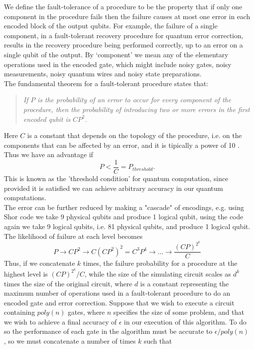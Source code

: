 We define the fault-tolerance of a procedure to be the property that if only one component in the procedure fails then the failure causes at most one error in each encoded block of the output qubits. For example, the failure of a single component, in a fault-tolerant recovery procedure for quantum error correction, results in the recovery procedure being performed correctly, up to an error on a single qubit of the output. By ‘component’ we mean any of the elementary operations used in the encoded gate, which might include noisy gates, noisy measurements, noisy quantum wires and noisy state preparations. \\
The fundamental theorem for a fault-tolerant procedure states that:
\begin{quote}
    \textit{If $P$ is the probability of an error to occur for every component of the procedure, then the probability of introducing two or more errors in the first encoded qubit is $CP^2$.}
\end{quote}
Here $C$ is a constant that depends on the topology of the procedure, i.e. on the components that can be affected by an error, and it is tipically a power of 10 \cite{Nielsen2010Dec}. \\
Thus we have an advantage if
\begin{equation}
    P < \frac{1}{C} = P_{threshold}.
\end{equation}
This is known as the 'threshold condition' for quantum computation, since provided it is satisfied we can achieve arbitrary accuracy in our quantum computations. \\
The error can be further reduced by making a "cascade" of encodings, e.g. using Shor code we take 9 physical qubits and produce 1 logical qubit, using the code again we take 9 logical qubits, i.e. 81 physical qubits, and produce 1 logical qubit. The likelihood of failure at each level becomes
\begin{equation}
    P \rightarrow CP^2 \rightarrow C(CP^2)^2 = C^3P^4 \rightarrow ... \rightarrow \frac{(CP)^{2^k}}{C}
\end{equation}
Thus, if we concatenate $k$ times, the failure probability for a procedure at the highest level is $(CP)^{2^k}/C$, while the size of the simulating circuit scales as $d^k$ times the size of the original circuit, where $d$ is a constant representing the maximum number of operations used in a fault-tolerant procedure to do an encoded gate and error correction. Suppose that we wish to execute a circuit containing $poly(n)$ gates, where $n$ specifies the size of some problem, and that we wish to achieve a final accuracy of $\epsilon$ in our execution of this algorithm. To do so the performance of each gate in the algorithm must be accurate to $\epsilon/poly(n)$, so we must concatenate a number of times $k$ such that
